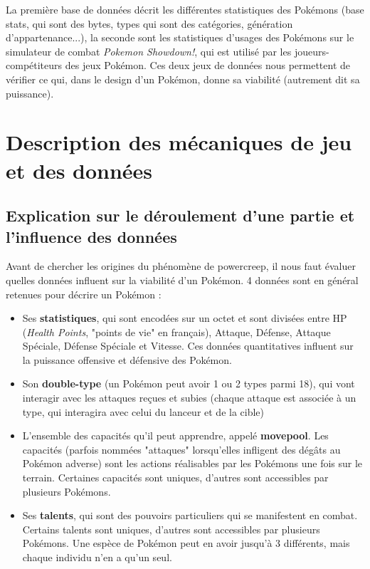 \documentclass[a4paper,12pt]{article}
\begin{document}
La première base de données décrit les différentes statistiques des Pokémons
(base stats, qui sont des bytes, types qui sont des catégories, génération
d'appartenance...), la seconde sont les statistiques d'usages des Pokémons sur
le simulateur de combat \textit{Pokemon Showdown!}, qui est utilisé par les
joueurs-compétiteurs des jeux Pokémon. Ces deux jeux de données nous permettent
de vérifier ce qui, dans le design d'un Pokémon, donne sa viabilité (autrement
dit sa puissance). 

\newpage
\section{Description des mécaniques de jeu et des données}
\subsection{Explication sur le déroulement d'une partie et l'influence des données}

Avant de chercher les origines du phénomène de powercreep, il nous faut évaluer
quelles données influent sur la viabilité d'un Pokémon. 4 données sont en
général retenues pour décrire un Pokémon :

\begin{itemize}
    \item Ses \textbf{statistiques}, qui sont encodées sur un octet et sont
    divisées entre HP (\textit{Health Points}, "points de vie" en français),
    Attaque, Défense, Attaque Spéciale, Défense Spéciale et Vitesse. Ces données
    quantitatives influent sur la puissance offensive et défensive des Pokémon.
    \item Son \textbf{double-type} (un Pokémon peut avoir 1 ou 2 types parmi
    18), qui vont interagir avec les attaques reçues et subies (chaque attaque
    est associée à un type, qui interagira avec celui du lanceur et de la cible)
    \item L'ensemble des capacités qu'il peut apprendre, appelé
    \textbf{movepool}. Les capacités (parfois nommées "attaques" lorsqu'elles
    infligent des dégâts au Pokémon adverse) sont les actions réalisables par
    les Pokémons une fois sur le terrain. Certaines capacités sont uniques,
    d'autres sont accessibles par plusieurs Pokémons.
    \item Ses \textbf{talents}, qui sont des pouvoirs particuliers qui se
    manifestent en combat. Certains talents sont uniques, d'autres sont
    accessibles par plusieurs Pokémons. Une espèce de Pokémon peut en avoir
    jusqu'à 3 différents, mais chaque individu n'en a qu'un seul.
\end{itemize}
\end{document}
